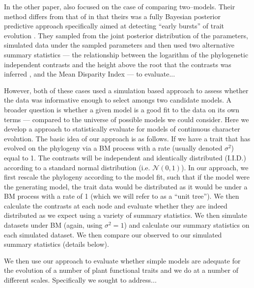 \documentclass[12pt]{article}
\begin{document}
In the other paper, \citet{SlaterPennell} also focused on the case of comparing two--models. Their method differs from that of \citet{Boettiger2012} in that theirs was a fully Bayesian posterior predictive approach specifically aimed at detecting ``early bursts'' of trait evolution \citep[\textit{sensu}][]{Simpson1944, Simpson1953, Harmon2010}. They sampled from the joint posterior distribution of the parameters, simulated data under the sampled parameters and then used two alternative summary statistics --- the relationship between the logarithm of the phylogenetic independent contrasts and the height above the root that the contrasts was inferred \citep[a.k.a. the ``node height test'';][]{FreckletonHarvey2006}, and the Mean Disparity Index \citep[MDI;][]{Harmon2003, Slater2010} --- to evaluate...

However, both of these cases used a simulation based approach to assess whether the data was informative enough to select amongs two candidate models. A broader question is whether a given model is a good fit to the data on its own terms --- compared to the universe of possible models we could consider. Here we develop a approach to statistically evaluate for models of continuous character evolution. The basic idea of our approach is as follows. If we have a trait that has evolved on the phylogeny via a BM process with a rate (usually denoted $\sigma^2$) equal to 1. The contrasts \citep[\textit{sensu}][see below]{Felsenstein1985} will be independent and identically distributed (I.I.D.) according to a standard normal distribution (i.e. $\mathcal{N}(0,1)$). In our approach, we first rescale the phylogeny according to the model fit, such that if the model were the generating model, the trait data would be distributed as it would be under a BM process with a rate of 1 (which we will refer to as a ``unit tree''). We then calculate the contrasts at each node and evaluate whether they are indeed distributed as we expect using a variety of summary statistics. We then simulate datasets under BM (again, using $\sigma^2 = 1$) and calculate our summary statistics on each simulated dataset. We then compare our observed to our simulated summary statistics (details below). 

We then use our approach to evaluate whether simple models are adequate for the evolution of a number of plant functional traits and we do at a number of different scales. Specifically we sought to address...
\end{document}
